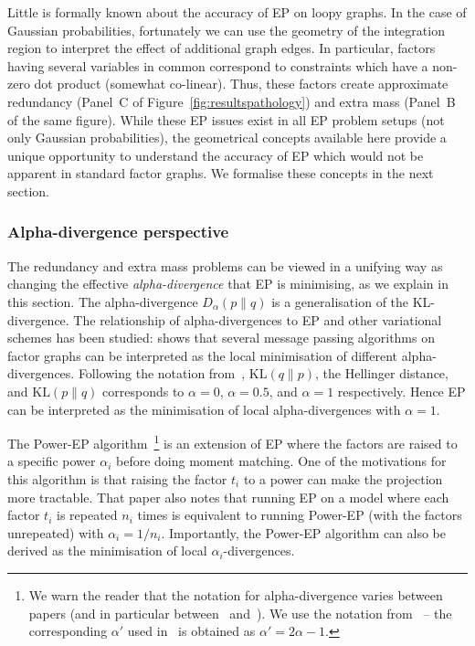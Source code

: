 \documentclass[twoside,11pt]{article}
\newcommand{\KL}{\text{KL}}
\begin{document}
Little is formally known about the accuracy of EP on loopy graphs.  In the case of Gaussian probabilities, fortunately we can use the geometry of the integration region to interpret the effect of additional graph edges. In particular, factors having several variables in common correspond to constraints which have a non-zero dot product (somewhat co-linear).  Thus, these factors create approximate redundancy (Panel~C of Figure~\ref{fig:resultspathology}) and extra mass (Panel~B of the same figure).   While these EP issues exist in all EP problem setups (not only Gaussian probabilities), the geometrical concepts available here provide a unique opportunity to understand the accuracy of EP which would not be apparent in standard factor graphs.  We formalise these concepts in the next section.  

\subsubsection{Alpha-divergence perspective}

The redundancy and extra mass problems can be viewed in a unifying way as changing the effective \emph{alpha-divergence} that EP is minimising, as we explain in this section. The alpha-divergence $D_{\alpha}(p \parallel q)$ is a generalisation of the KL-divergence.  The relationship of alpha-divergences to EP and other variational schemes has been studied: \cite{minkaMSFTTR2005} shows that several message passing algorithms on factor graphs can be interpreted as the local minimisation of different alpha-divergences. Following the notation from~\cite{minkaMSFTTR2005}, $\KL (q \parallel p)$, the Hellinger distance, and $\KL (p \parallel q)$ corresponds to $\alpha=0$, $\alpha=0.5$, and $\alpha=1$ respectively. Hence EP can be interpreted as the minimisation of local alpha-divergences with $\alpha=1$. 

The Power-EP algorithm~\cite[]{PowerEP}\footnote{We warn the reader that the notation for alpha-divergence varies between papers (and in particular between~\cite{PowerEP} and~\cite{minkaMSFTTR2005}). We use the notation from~\cite{minkaMSFTTR2005} -- the corresponding $\alpha'$ used in~\cite{PowerEP} is obtained as $\alpha' = 2 \alpha - 1$.} is an extension of EP where the factors are raised to a specific power $\alpha_i$ before doing moment matching. One of the motivations for this algorithm is that raising the factor $t_i$ to a power can make the projection more tractable.  That paper also notes that running EP on a model where each factor $t_i$ is repeated $n_i$ times is equivalent to running Power-EP (with the factors unrepeated) with $\alpha_i = 1/n_i$.  Importantly, the Power-EP algorithm can also be derived as the minimisation of local $\alpha_i$-divergences. 
\end{document}
